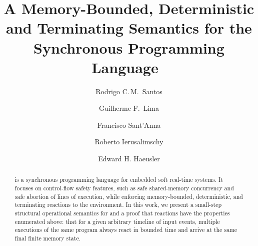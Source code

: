 \documentclass[sigplan,protrusion=true,expansion,screen]{acmart}
\begin{document}
\title[A Memory-Bounded, Deterministic and Terminating Semantics for~\CEU]
{A Memory-Bounded, Deterministic and Terminating Semantics for the
       Synchronous Programming Language~\CEU}

\author[Santos]{Rodrigo C.\,M.~Santos}
%
\author[Lima]{Guilherme F.~Lima}
%
\author[Sant'Anna]{Francisco Sant'Anna}
%
\author[Ierusalimschy]{Roberto Ierusalimschy}
%
\author[Haeusler]{Edward H. Haeusler}

\begin{abstract}
\CEU is a synchronous programming language for embedded soft real-time systems.
%
It focuses on control-flow safety features, such as safe shared-memory
concurrency and safe abortion of lines of execution, while enforcing
memory-bounded, deterministic, and terminating reactions to the environment.
%
In this work, we present a small-step structural operational semantics for
\CEU and a proof that reactions have the properties enumerated above:
%
that for a given arbitrary timeline of input events, multiple executions of the
same program always react in bounded time and arrive at the same final finite
memory state.
%
\end{abstract}


\begin{comment}
\begin{CCSXML}
<ccs2012>
 <concept>
  <concept_id>10003752.10010124.10010131.10010134</concept_id>
  <concept_desc>Theory of computation~Operational semantics</concept_desc>
  <concept_significance>500</concept_significance>
 </concept>
 <concept>
  <concept_id>10011007.10011006.10011008.10011009.10011014</concept_id>
  <concept_desc>Software and its
                engineering~Concurrent programming languages</concept_desc>
  <concept_significance>500</concept_significance>
 </concept>
 <concept>
  <concept_id>10010520.10010553.10010562.10010564</concept_id>
  <concept_desc>Computer systems
                organization~Embedded software</concept_desc>
  <concept_significance>300</concept_significance>
 </concept>
</ccs2012>
\end{CCSXML}
\ccsdesc[500]{Theory of computation~Operational semantics}
\ccsdesc[500]{Software and its engineering~Concurrent programming languages}
\ccsdesc[300]{Computer systems organization~Embedded software}
\end{comment}
\end{document}
